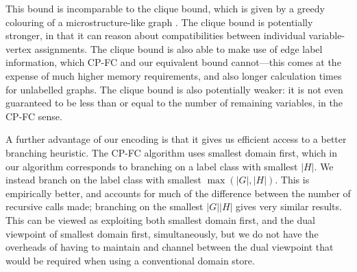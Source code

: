 \documentclass[letterpaper]{article}
\newcommand{\citep}[1]{\cite{#1}}
\newcommand{\McSplit}{\textproc{McSplit}}
\newcommand{\graphG}{\mathcal{G}}
\newcommand{\setG}{G}
\newcommand{\setH}{H}
\newcommand{\linerangeref}[2]{\count255=\ref{#1}\advance\count255 by 1 \ifnum\count255=\ref{#2}lines~\ref{#1} and~\ref{#2}\else lines~\ref{#1} to~\ref{#2}\fi}
\DeclareMathOperator{\N}{N}
\DeclareMathOperator{\invN}{\overline{N}}
\begin{document}

This bound is incomparable to the clique bound, which is given by a greedy
colouring of a microstructure-like graph \citep{DBLP:conf/cp/McCreeshNPS16}.
The clique bound is potentially stronger, in that it can reason about
compatibilities between individual variable-vertex assignments. The clique
bound is also able to make use of edge label information, which CP-FC and our
equivalent bound cannot---this comes at the expense of much higher memory
requirements, and also longer calculation times for unlabelled graphs. The
clique bound is also potentially weaker: it is not even guaranteed to be less
than or equal to the number of remaining variables, in the CP-FC sense.

A further advantage of our encoding is that it gives us efficient access to a
better branching heuristic. The CP-FC algorithm uses smallest domain first,
which in our algorithm corresponds to branching on a label class with smallest
$|\setH|$. We instead branch on the label class with smallest $\max(|\setG|,|\setH|)$.
This is empirically better, and accounts for much of the difference between
the number of recursive calls made; branching on the smallest $|\setG| |\setH|$ gives
very similar results. This can be viewed as exploiting both smallest domain first,
and the dual viewpoint \citep{DBLP:conf/ecai/Geelen92} of smallest domain
first, simultaneously, but we do not have the overheads of having to maintain
and channel between the dual viewpoint that would be required when using a
conventional domain store.
\end{document}
